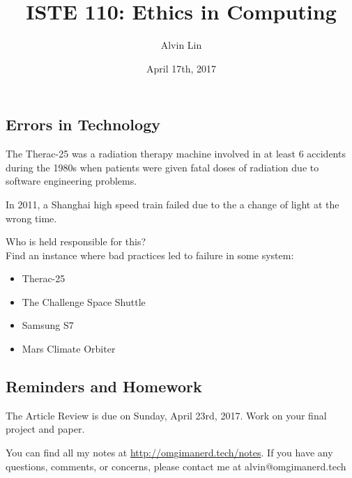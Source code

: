 \documentclass[letterpaper, 12pt]{article}
\title{ISTE 110: Ethics in Computing}
\author{Alvin Lin}
\date{April 17th, 2017}
\begin{document}
\maketitle

\subsection*{Errors in Technology}
The Therac-25 was a radiation therapy machine involved in at least 6 accidents
during the 1980s when patients were given fatal doses of radiation due to
software engineering problems. \par
In 2011, a Shanghai high speed train failed due to the a change of light at
the wrong time. \par
Who is held responsible for this? \\
Find an instance where bad practices led to failure in some system:
\begin{itemize}
  \item Therac-25
  \item The Challenge Space Shuttle
  \item Samsung S7
  \item Mars Climate Orbiter
\end{itemize}

\subsection*{Reminders and Homework}
The Article Review is due on Sunday, April 23rd, 2017.
Work on your final project and paper.

\begin{center}
  You can find all my notes at \url{http://omgimanerd.tech/notes}. If you have
  any questions, comments, or concerns, please contact me at
  alvin@omgimanerd.tech
\end{center}
\end{document}
